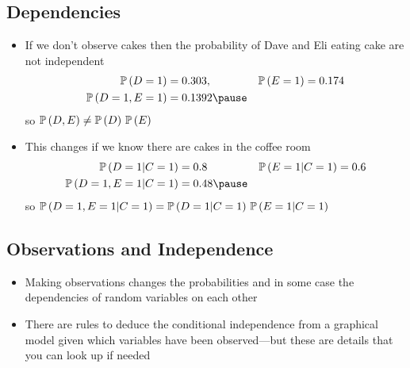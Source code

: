 
\begin{slide}
\section[-1]{Dependencies}

\begin{PauseHighLight}
  \begin{itemize}
  \item If we don't observe cakes then the probability of Dave and Eli
    eating cake are not independent
    \begin{align*}
      \Prob{D=1} &= 0.303, & \Prob{E=1} &= 0.174 \\
      \Prob{D=1,E=1} &= 0.1392\pause
    \end{align*}
    so \(\mathbb{P}\left( D,E \right)\neq\mathbb{P}\left( D \right)\,\mathbb{P}\left( E \right)\)\pauseb
  \item This changes if we know there are cakes in the coffee room
    \begin{align*}
      \Prob{D=1|C=1} &= 0.8 & \Prob{E=1|C=1} &= 0.6 \\
      \Prob{D=1,E=1|C=1} &= 0.48\pause
    \end{align*}
    so $\mathbb{P}\left( D=1,E=1|C=1 \right)= \mathbb{P}\left( D=1|C=1 \right)\, \mathbb{P}\left( E=1|C=1 \right)$\pauseb
  \end{itemize}
\end{PauseHighLight}

\end{slide}



\begin{slide}
\section[-2]{Observations and Independence}

\pb
\begin{itemize}
\item Making observations changes the probabilities and in some case the
  dependencies of random variables
  on each other\pauseh
\end{itemize}
\begin{center}
  \pause
\end{center}
\begin{itemize}
\item There are rules to deduce the conditional independence from a
  graphical model given which variables have been observed\pause---but
  these are details that you can look up if needed\pause
\end{itemize}
\end{slide}

